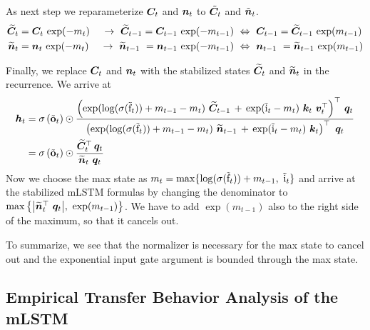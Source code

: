 \documentclass{article}
\begin{document}
    As next step we reparameterize $\bm{C}_t$ and $\bm{n}_t$ to $\tilde{\bm{C}}_t$ and $\tilde{\bm{n}}_t$.
    \begin{equation}
        \begin{aligned}
            \widetilde{\bm{C}}_t & = \bm{C}_t \, \exp(-m_t) \  & \rightarrow \ \widetilde{\bm{C}}_{t-1} = \bm{C}_{t-1} \, \exp(-m_{t-1}) \    & \Leftrightarrow \ {\bm{C}}_{t-1} = \widetilde{\bm{C}}_{t-1} \,
            \exp(m_{t-1})                                                                                                                                                                      \\
            \widetilde{\bm{n}}_t & = \bm{n}_t \, \exp(-m_t) \  & \rightarrow \ \widetilde{\bm{n}}_{t-1} \ = \bm{n}_{t-1} \, \exp(-m_{t-1}) \  & \Leftrightarrow \ {\bm{n}}_{t-1} \ = \widetilde{\bm{n}}_{t-1} \,
            \exp(m_{t-1})
        \end{aligned}
    \end{equation}

    Finally, we replace $\bm{C}_t$ and $\bm{n}_t$ with the stabilized states $\widetilde{\bm{C}}_t$ and $\widetilde{\bm{n}}_t$ in the recurrence.
    We arrive at
    \begin{equation}
        \begin{aligned}
            \Bh_t & = \sigma \left( \tilde{\bfo}_t \right) \odot \frac{\left( \exp( \log(\sigma(\tilde{\Rf}_t)) + m_{t-1} - m_t) \ \widetilde{\BC}_{t-1} \, + \, \exp(\tilde{\Ri}_t - m_t) \ {\Bk_t \ \Bv_t^\top} \right)^\top \, \Bq_t}{\left( \exp( \log(\sigma(\tilde{\Rf}_t)) + m_{t-1} - m_t) \ \widetilde{\Bn}_{t-1} \, + \, \exp(\tilde{\Ri}_t - m_t) \ \Bk_t \right)^\top \ \Bq_t} \\
                  & = \sigma \left( \tilde{\bfo}_t \right) \odot \frac{ \widetilde{\BC}_t^\top \, \Bq_t}{\widetilde{\Bn}_t \ \Bq_t}
        \end{aligned}
    \end{equation}
    Now we choose the max state as $m_t = \max \{\log(\sigma(\tilde{\mathrm{f}}_t)) + m_{t-1}, \ \tilde{\mathrm{i}}_t \}$ and arrive at the stabilized mLSTM formulas by changing the denominator to $\max \left\{ {{\left| \widetilde{\bm{n}}_t^\top \ \bm{q}_t \right|}}, \ \exp(m_{t-1}) \right\}$.
    We have to add $\exp(m_{t-1})$ also to the right side of the maximum, so that it cancels out.

    To summarize, we see that the normalizer is necessary for the max state to cancel out and the exponential input gate argument is bounded through the max state.

    \subsection{Empirical Transfer Behavior Analysis of the mLSTM}
    \label{app:emp_transfer_behavior_mlstm}
\end{document}
